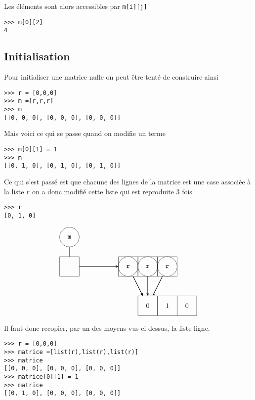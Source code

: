 Les éléments sont alors accessibles par \lstinline?m[i][j]?

\begin{lstlisting}
>>> m[0][2]
4
\end{lstlisting}

\subsection{Initialisation}

Pour initialiser une matrice nulle on peut être tenté de construire ainsi 

\begin{lstlisting}
>>> r = [0,0,0]
>>> m =[r,r,r]
>>> m
[[0, 0, 0], [0, 0, 0], [0, 0, 0]]
\end{lstlisting}


Mais voici ce qui se passe quand on modifie un terme

\begin{lstlisting}
>>> m[0][1] = 1
>>> m
[[0, 1, 0], [0, 1, 0], [0, 1, 0]]
\end{lstlisting}

Ce qui s'est passé est que chacune des lignes de la matrice est une case associée à la liste \lstinline?r? on a donc modifié cette liste qui est reproduite 3 fois

\begin{lstlisting}
>>> r
[0, 1, 0]
\end{lstlisting}

$$\tikzpicture
 \tikzstyle{every node}=[draw,minimum size =10mm]
 \node[circle] (m) {\tt m}
  child {node[rectangle](l){}};
 \node[rectangle](l0) at (3,-1.5) {{\tt r}};
 \node[circle](ll0) at (3,-1.5) {};
 \node[rectangle](l1) at (4,-1.5) {{\tt r}};
 \node[circle](ll1) at (4,-1.5) {};
 \node[rectangle](l2) at (5,-1.5) {{\tt r}};
 \node[circle](ll2) at (5,-1.5) {};
 \draw [thick,-stealth] (l) -- (l0);
 \node[rectangle](r0) at (4,-3.5) {0};
 \node[rectangle](r1) at (5,-3.5) {1};
 \node[rectangle](r2) at (6,-3.5) {0};
 \draw [thick,-stealth] (l0) -- (r0);
 \draw [thick,-stealth] (l1) -- (r0);
 \draw [thick,-stealth] (l2) -- (r0);

\endtikzpicture
$$


Il faut donc recopier, par un des moyens vus ci-dessus, la liste ligne.

\begin{lstlisting}
>>> r = [0,0,0]
>>> matrice =[list(r),list(r),list(r)]
>>> matrice
[[0, 0, 0], [0, 0, 0], [0, 0, 0]]
>>> matrice[0][1] = 1
>>> matrice
[[0, 1, 0], [0, 0, 0], [0, 0, 0]]
\end{lstlisting}

